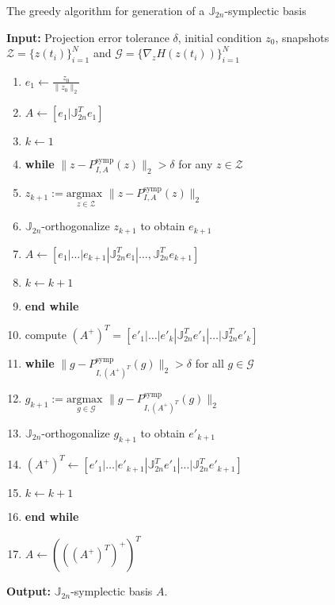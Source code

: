 \begin{algorithm} 
\caption{The greedy algorithm for generation of a $\mathbb J_{2n}$-symplectic basis} \label{alg:1}
{\bf Input:} Projection error tolerance $\delta$, initial condition $ z_0$, snapshots $\mathcal Z = \{ z(t_i) \}_{i=1}^{N}$ and $\mathcal G = \{ \nabla_z H(z(t_i)) \}_{i=1}^{N}$
\begin{enumerate}
\item $e_1 \leftarrow \frac{z_0}{\|z_0\|_2}$
\item $A \leftarrow [e_1|\mathbb J^T_{2n}e_1]$
\item $k \leftarrow 1$
\item \textbf{while} $\| z - P^\text{symp}_{I,A}( z ) \|_2 > \delta$ for any $z\in \mathcal Z$
\item \hspace{0.5cm} $z_{k+1} := \underset{z\in \mathcal Z}{\text{argmax }} \| z - P^\text{symp}_{I,A}( z ) \|_2$
\item \hspace{0.5cm} $\mathbb J_{2n}$-orthogonalize $ z_{k+1}$ to obtain $e_{k+1}$
\item \hspace{0.5cm} $A \leftarrow [e_1|\dots |e_{k+1} | \mathbb J^T_{2n}e_1|\dots,\mathbb J^T_{2n}e_{k+1}]$
\item \hspace{0.5cm} $k \leftarrow k+1$
\item \textbf{end while}
\item compute $(A^+)^T=[e'_1|\dots|e'_k|\mathbb J^T_{2n}e'_1|\dots|\mathbb J^T_{2n}e'_k]$
\item \textbf{while} $\| g - P^\text{symp}_{I,(A^+)^T}(g) \|_2 > \delta$ for all $g \in \mathcal G$
\item \hspace{0.5cm} $g_{k+1} := \underset{g \in \mathcal G}{\text{argmax }} \| g - P^\text{symp}_{I,(A^+)^T}(g) \|_2$
\item \hspace{0.5cm} $\mathbb J_{2n}$-orthogonalize $g_{k+1}$ to obtain $e'_{k+1}$
\item \hspace{0.5cm} $(A^+)^T \leftarrow [e'_1|\dots |e'_{k+1} | \mathbb J^T_{2n}e'_1|\dots|\mathbb J^T_{2n}e'_{k+1}]$
\item \hspace{0.5cm} $k \leftarrow k+1$
\item \textbf{end while}
\item $A \leftarrow \left( \left( \left( A^+\right) ^T \right ) ^+ \right)^T$
\end{enumerate}
\vspace{0.5cm}
{\bf Output:} $\mathbb J_{2n}$-symplectic basis $A$.
\end{algorithm}
